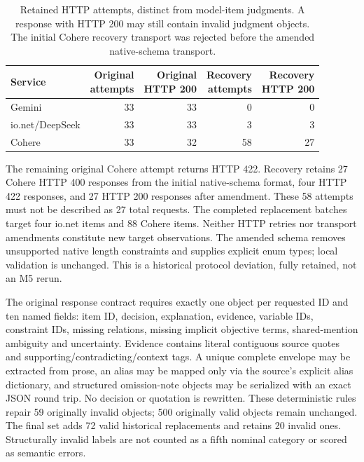 \begin{table}[htbp]\centering\small
\caption{Retained HTTP attempts, distinct from model-item judgments. A response with HTTP 200 may still contain invalid judgment objects. The initial Cohere recovery transport was rejected before the amended native-schema transport.}\label{tab:relationship-requests}
\begin{tabular}{@{}lrrrr@{}}\toprule
Service & \shortstack{Original\\attempts} & \shortstack{Original\\HTTP 200} & \shortstack{Recovery\\attempts} & \shortstack{Recovery\\HTTP 200}\\\midrule
Gemini & 33 & 33 & 0 & 0\\
io.net/DeepSeek & 33 & 33 & 3 & 3\\
Cohere & 33 & 32 & 58 & 27\\\bottomrule
\end{tabular}\end{table}
The remaining original Cohere attempt returns HTTP 422. Recovery retains 27 Cohere HTTP 400 responses from the initial native-schema format, four HTTP 422 responses, and 27 HTTP 200 responses after amendment. These 58 attempts must not be described as 27 total requests. The completed replacement batches target four io.net items and 88 Cohere items. Neither HTTP retries nor transport amendments constitute new target observations. The amended schema removes unsupported native length constraints and supplies explicit enum types; local validation is unchanged. This is a historical protocol deviation, fully retained, not an M5 rerun.

The original response contract requires exactly one object per requested ID and ten named fields: item ID, decision, explanation, evidence, variable IDs, constraint IDs, missing relations, missing implicit objective terms, shared-mention ambiguity and uncertainty. Evidence contains literal contiguous source quotes and supporting/contradicting/context tags. A unique complete envelope may be extracted from prose, an alias may be mapped only via the source's explicit alias dictionary, and structured omission-note objects may be serialized with an exact JSON round trip. No decision or quotation is rewritten. These deterministic rules repair 59 originally invalid objects; 500 originally valid objects remain unchanged. The final set adds 72 valid historical replacements and retains 20 invalid ones. Structurally invalid labels are not counted as a fifth nominal category or scored as semantic errors.

